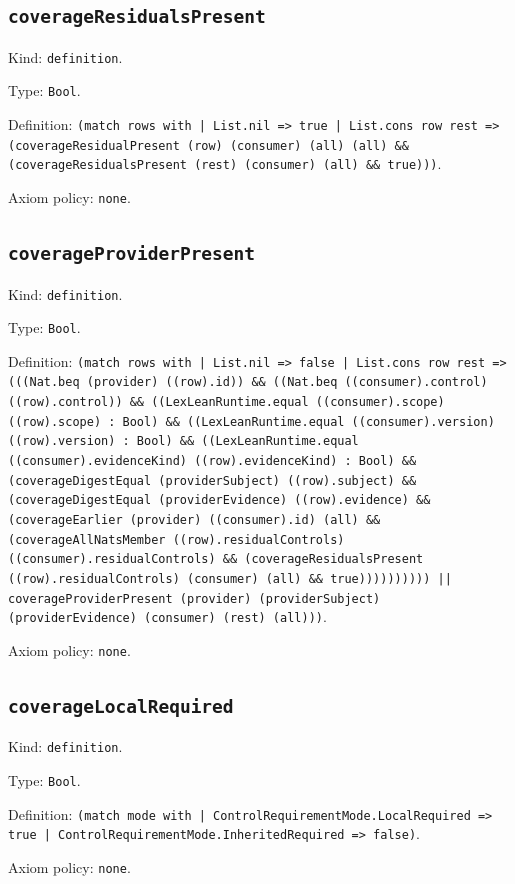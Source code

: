 \documentclass[11pt]{article}
\begin{document}
\subsection*{\texttt{coverageResidualsPresent}}
\noindent Kind: \texttt{definition}.\par
\noindent Type: \texttt{Bool}.\par
\noindent Definition: \texttt{(match rows with | List.nil => true | List.cons row rest => (coverageResidualPresent (row) (consumer) (all) (all) \&\& (coverageResidualsPresent (rest) (consumer) (all) \&\& true)))}.\par
\noindent Axiom policy: \texttt{none}.\par
\subsection*{\texttt{coverageProviderPresent}}
\noindent Kind: \texttt{definition}.\par
\noindent Type: \texttt{Bool}.\par
\noindent Definition: \texttt{(match rows with | List.nil => false | List.cons row rest => (((Nat.beq (provider) ((row).id)) \&\& ((Nat.beq ((consumer).control) ((row).control)) \&\& ((LexLeanRuntime.equal ((consumer).scope) ((row).scope) : Bool) \&\& ((LexLeanRuntime.equal ((consumer).version) ((row).version) : Bool) \&\& ((LexLeanRuntime.equal ((consumer).evidenceKind) ((row).evidenceKind) : Bool) \&\& (coverageDigestEqual (providerSubject) ((row).subject) \&\& (coverageDigestEqual (providerEvidence) ((row).evidence) \&\& (coverageEarlier (provider) ((consumer).id) (all) \&\& (coverageAllNatsMember ((row).residualControls) ((consumer).residualControls) \&\& (coverageResidualsPresent ((row).residualControls) (consumer) (all) \&\& true)))))))))) || coverageProviderPresent (provider) (providerSubject) (providerEvidence) (consumer) (rest) (all)))}.\par
\noindent Axiom policy: \texttt{none}.\par
\subsection*{\texttt{coverageLocalRequired}}
\noindent Kind: \texttt{definition}.\par
\noindent Type: \texttt{Bool}.\par
\noindent Definition: \texttt{(match mode with | ControlRequirementMode.LocalRequired => true | ControlRequirementMode.InheritedRequired => false)}.\par
\noindent Axiom policy: \texttt{none}.\par
\end{document}
